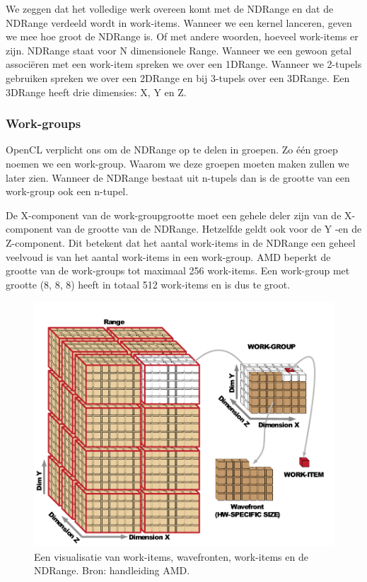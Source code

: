 We zeggen dat het volledige werk overeen komt met de NDRange en dat de NDRange verdeeld wordt in work-items. Wanneer we een kernel lanceren, geven we mee hoe groot de NDRange is. Of met andere woorden, hoeveel work-items er zijn. NDRange staat voor N dimensionele Range. Wanneer we een gewoon getal associ\"eren met een work-item spreken we over een 1DRange. Wanneer we 2-tupels gebruiken spreken we over een 2DRange en bij 3-tupels over een 3DRange. Een 3DRange heeft drie dimensies: X, Y en Z.

\subsubsection{Work-groups}
OpenCL verplicht ons om de NDRange op te delen in groepen. Zo \'e\'en groep noemen we een work-group. Waarom we deze groepen moeten maken zullen we later zien. Wanneer de NDRange bestaat uit n-tupels dan is de grootte van een work-group ook een n-tupel.

De X-component van de work-groupgrootte moet een gehele deler zijn van de X-component van de grootte van de NDRange. Hetzelfde geldt ook voor de Y -en de Z-component. Dit betekent dat het aantal work-items in de NDRange een geheel veelvoud is van het aantal work-items in een work-group. AMD beperkt de grootte van de work-groups tot maximaal 256 work-items. Een work-group met grootte (8, 8, 8) heeft in totaal 512 work-items en is dus te groot.


\begin{figure}[]
\centering
\includegraphics{workitem}
\caption{\label{workitem}Een visualisatie van work-items, wavefronten, work-items en de NDRange. Bron: handleiding AMD\cite[p.~1-9]{amd}.}
\end{figure}

